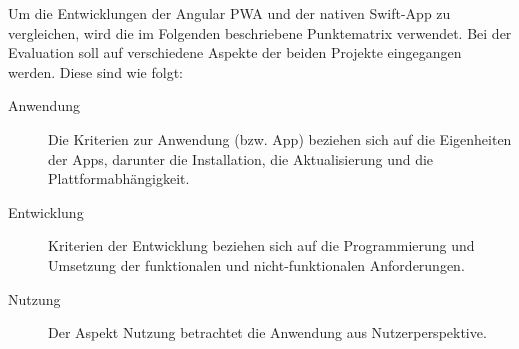 Um die Entwicklungen der Angular PWA und der nativen Swift-App zu vergleichen, wird die im Folgenden beschriebene Punktematrix verwendet. Bei der Evaluation soll auf verschiedene Aspekte der beiden Projekte eingegangen werden. Diese sind wie folgt:
\begin{description}
	\item [Anwendung]
		Die Kriterien zur Anwendung (bzw. App) beziehen sich auf die Eigenheiten der Apps, darunter die Installation, die Aktualisierung und die Plattformabhängigkeit.
		
	\item [Entwicklung]
		Kriterien der Entwicklung beziehen sich auf die Programmierung und Umsetzung der funktionalen und nicht-funktionalen Anforderungen.
		
	\item [Nutzung]
		Der Aspekt Nutzung betrachtet die Anwendung aus Nutzerperspektive.
		
\end{description}

